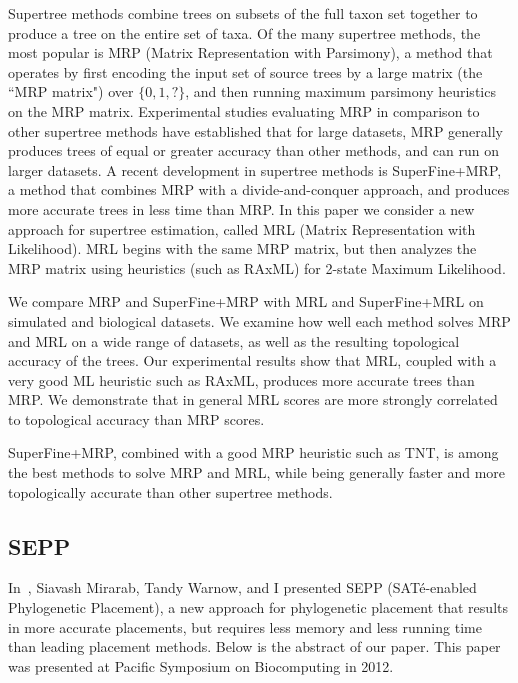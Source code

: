 \documentclass[times, 10pt]{article}
\begin{document}
Supertree methods combine trees on subsets of the full taxon set together 
to produce a tree on the entire set of taxa.  
Of the many supertree methods, the most popular is MRP 
(Matrix Representation with Parsimony), a method that operates by first 
encoding the input set of source trees by a large matrix (the ``MRP matrix") 
over $\{0,1,?\}$, and then running maximum parsimony heuristics on the MRP matrix.   
Experimental studies evaluating MRP in comparison to other supertree methods 
have established that for large datasets, MRP generally produces trees of equal or 
greater accuracy than other methods, and can run on larger datasets.   
A recent development in supertree methods is SuperFine+MRP, a method that combines MRP with a 
divide-and-conquer approach, and produces more accurate trees in less time than MRP.  
In this paper we consider a new approach for supertree estimation, called MRL (Matrix Representation with Likelihood).  
MRL begins with the same MRP matrix, but then analyzes the MRP matrix using heuristics (such as RAxML) for 2-state Maximum Likelihood.  

We compare MRP and SuperFine+MRP with MRL and SuperFine+MRL on simulated and biological datasets.  We examine how well each method solves MRP and MRL on a wide range of datasets, as well as the resulting topological accuracy of the trees.  
Our experimental results show that MRL, coupled with a very good ML heuristic such as RAxML, produces more accurate trees than MRP.  We demonstrate that in general MRL scores are more strongly correlated to topological accuracy than MRP scores.  

SuperFine+MRP, combined with a good MRP heuristic such as TNT, is among the best methods to solve MRP and MRL, while being generally faster and more topologically accurate than other supertree methods.  

\subsection{SEPP}
In~\cite{Mirarab2012}, Siavash Mirarab, Tandy Warnow, and I presented SEPP (SAT\'{e}-enabled Phylogenetic Placement), a new approach for phylogenetic placement that results in more accurate placements, but requires less memory and less running time than leading placement methods.  Below is the abstract of our paper.  This paper was presented at Pacific Symposium on Biocomputing in 2012.
\end{document}
